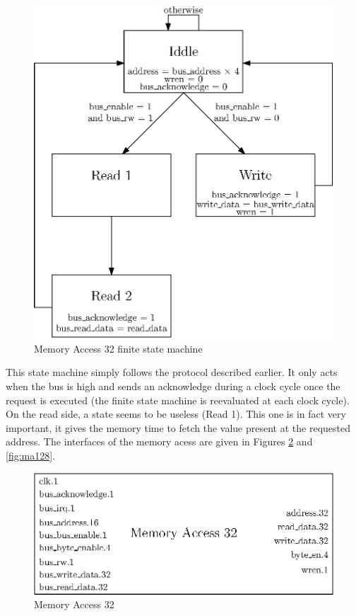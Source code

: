 \begin{figure}[H]
    \center
    \includegraphics[scale=0.8]{"Chapter4-MAU_CTRLU/res/mau_fsm"}
    \caption{Memory Access 32 finite state machine}
    \label{fig:ma_fsm}
\end{figure}

This state machine simply follows the protocol described earlier. It only acts when the bus is high 
and sends an acknowledge during a clock cycle once the request is executed (the finite state machine 
is reevaluated at each clock cycle). On the read side, a state seems to be useless (Read 1). This 
one is in fact very important, it gives the memory time to fetch the value present at the requested 
address. The interfaces of the memory acess are given in Figures \ref{fig:ma32} and \ref{fig:ma128}.

\begin{figure}[H]
    \center
    \includegraphics[scale=0.8]{"Chapter4-MAU_CTRLU/res/memory_access_32"}
    \caption{Memory Access 32}
    \label{fig:ma32}
\end{figure}

